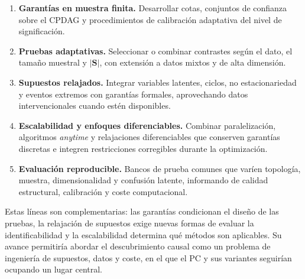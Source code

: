 \begin{enumerate}
  \item \textbf{Garantías en muestra finita.} Desarrollar cotas, conjuntos de confianza
  sobre el CPDAG y procedimientos de calibración adaptativa del nivel de significación.
  \item \textbf{Pruebas adaptativas.} Seleccionar o combinar contrastes según el dato, el
  tamaño muestral y $|\mathbf{S}|$, con extensión a datos mixtos y de alta dimensión.
  \item \textbf{Supuestos relajados.} Integrar variables latentes, ciclos,
  no estacionariedad y eventos extremos con garantías formales, aprovechando datos
  intervencionales cuando estén disponibles.
  \item \textbf{Escalabilidad y enfoques diferenciables.} Combinar paralelización,
  algoritmos \emph{anytime} y relajaciones diferenciables que conserven garantías discretas
  e integren restricciones corregibles durante la optimización.
  \item \textbf{Evaluación reproducible.} Bancos de prueba comunes que varíen topología,
  muestra, dimensionalidad y confusión latente, informando de calidad estructural,
  calibración y coste computacional.
\end{enumerate}

Estas líneas son complementarias: las garantías condicionan el diseño de las pruebas, la
relajación de supuestos exige nuevas formas de evaluar la identificabilidad y la
escalabilidad determina qué métodos son aplicables. Su avance permitiría abordar el
descubrimiento causal como un problema de ingeniería de supuestos, datos y coste, en el que
el PC y sus variantes seguirían ocupando un lugar central.